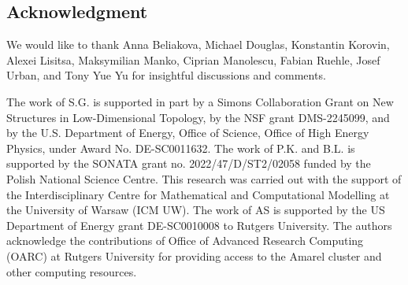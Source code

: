 
\subsection*{Acknowledgment}

We would like to thank Anna Beliakova, Michael Douglas, Konstantin Korovin, Alexei Lisitsa, Maksymilian Manko, Ciprian Manolescu, Fabian Ruehle, Josef Urban, and Tony Yue Yu for insightful discussions and comments.

The work of S.G. is supported in part by a Simons Collaboration Grant on New Structures in Low-Dimensional Topology, by the NSF grant DMS-2245099, and by the U.S. Department of Energy, Office of Science, Office of High Energy Physics, under Award No. DE-SC0011632. The work of P.K. and B.L. is supported by the SONATA grant no. 2022/47/D/ST2/02058 funded by the Polish National Science Centre. This research was carried out with the support of the Interdisciplinary Centre for Mathematical and Computational Modelling at the University of Warsaw (ICM UW). The work of AS is supported by the US Department of Energy grant DE-SC0010008 to Rutgers University. The authors acknowledge the contributions of Office of Advanced Research Computing (OARC) at Rutgers University for providing access to the Amarel cluster and other computing resources. 
